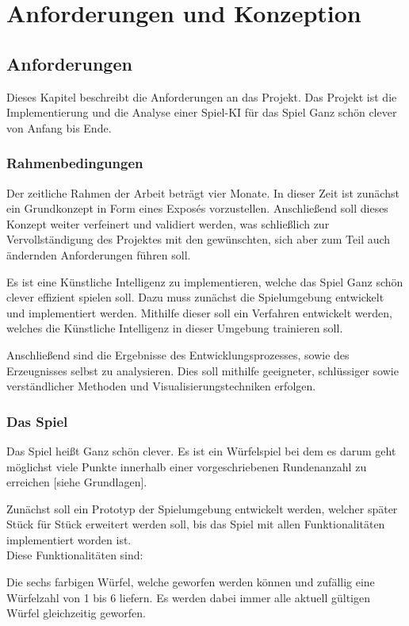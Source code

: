 \section{Anforderungen und Konzeption}
\subsection{Anforderungen}
Dieses Kapitel beschreibt die Anforderungen an das Projekt. Das Projekt ist die Implementierung und die Analyse einer Spiel-KI für das Spiel Ganz schön clever von Anfang bis Ende.
\subsubsection{Rahmenbedingungen}
Der zeitliche Rahmen der Arbeit beträgt vier Monate. In dieser Zeit ist zunächst ein Grundkonzept in Form eines Exposés vorzustellen. Anschließend soll dieses Konzept weiter verfeinert und validiert werden, was schließlich zur Vervollständigung des Projektes mit den gewünschten, sich aber zum Teil auch ändernden Anforderungen führen soll. 

Es ist eine Künstliche Intelligenz zu implementieren, welche das Spiel Ganz schön clever effizient spielen soll. Dazu muss zunächst die Spielumgebung entwickelt und implementiert werden. Mithilfe dieser soll ein Verfahren entwickelt werden, welches die Künstliche Intelligenz in dieser Umgebung trainieren soll.

Anschließend sind die Ergebnisse des Entwicklungsprozesses, sowie des Erzeugnisses selbst zu analysieren. Dies soll mithilfe geeigneter, schlüssiger sowie verständlicher Methoden und Visualisierungstechniken erfolgen.
\subsubsection{Das Spiel}
Das Spiel heißt Ganz schön clever. Es ist ein Würfelspiel bei dem es darum geht möglichst viele Punkte innerhalb einer vorgeschriebenen Rundenanzahl zu erreichen [siehe Grundlagen].

Zunächst soll ein Prototyp der Spielumgebung entwickelt werden, welcher später Stück für Stück erweitert werden soll, bis das Spiel mit allen Funktionalitäten implementiert worden ist.\\

Diese Funktionalitäten sind:

Die sechs farbigen Würfel, welche geworfen werden können und zufällig eine Würfelzahl von 1 bis 6 liefern. Es werden dabei immer alle aktuell gültigen Würfel gleichzeitig geworfen.

